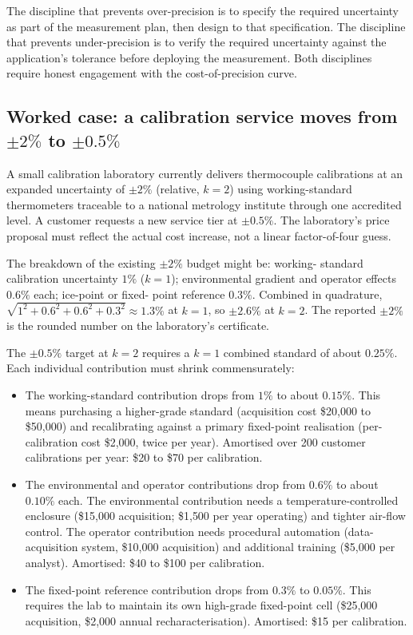 The discipline that prevents over-precision is to specify the
required uncertainty as part of the measurement plan, then design
to that specification. The discipline that prevents under-precision
is to verify the required uncertainty against the application's
tolerance before deploying the measurement. Both disciplines
require honest engagement with the cost-of-precision curve.

\subsection{Worked case: a calibration service moves from $\pm 2\%$ to $\pm 0.5\%$}

A small calibration laboratory currently delivers thermocouple
calibrations at an expanded uncertainty of $\pm 2\%$ (relative,
$k = 2$) using working-standard thermometers traceable to a
national metrology institute through one accredited level. A
customer requests a new service tier at $\pm 0.5\%$. The
laboratory's price proposal must reflect the actual cost increase,
not a linear factor-of-four guess.

The breakdown of the existing $\pm 2\%$ budget might be: working-
standard calibration uncertainty $1\%$ ($k = 1$); environmental
gradient and operator effects $0.6\%$ each; ice-point or fixed-
point reference $0.3\%$. Combined in quadrature, $\sqrt{1^{2} +
0.6^{2} + 0.6^{2} + 0.3^{2}} \approx 1.3\%$ at $k = 1$, so $\pm
2.6\%$ at $k = 2$. The reported $\pm 2\%$ is the rounded number on
the laboratory's certificate.

The $\pm 0.5\%$ target at $k = 2$ requires a $k = 1$ combined
standard of about $0.25\%$. Each individual contribution must
shrink commensurately:

\begin{itemize}[leftmargin=*]
  \item The working-standard contribution drops from $1\%$ to about
    $0.15\%$. This means purchasing a higher-grade standard
    (acquisition cost \$20{,}000 to \$50{,}000) and recalibrating
    against a primary fixed-point realisation (per-calibration
    cost \$2{,}000, twice per year). Amortised over 200 customer
    calibrations per year: \$20 to \$70 per calibration.
  \item The environmental and operator contributions drop from
    $0.6\%$ to about $0.10\%$ each. The environmental contribution
    needs a temperature-controlled enclosure (\$15{,}000
    acquisition; \$1{,}500 per year operating) and tighter air-flow
    control. The operator contribution needs procedural automation
    (data-acquisition system, \$10{,}000 acquisition) and
    additional training (\$5{,}000 per analyst). Amortised:
    \$40 to \$100 per calibration.
  \item The fixed-point reference contribution drops from $0.3\%$
    to $0.05\%$. This requires the lab to maintain its own
    high-grade fixed-point cell (\$25{,}000 acquisition, \$2{,}000
    annual recharacterisation). Amortised: \$15 per calibration.
\end{itemize}


